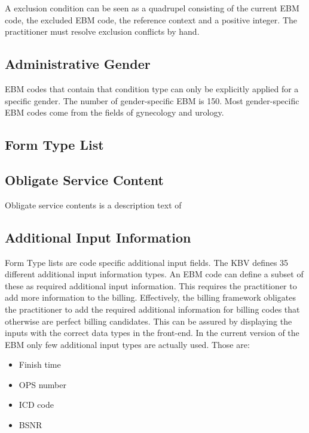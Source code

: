A exclusion condition can be seen as a quadrupel consisting of the current EBM code, the excluded EBM code, the reference context and a positive integer.
The practitioner must resolve exclusion conflicts by hand.

\subsection{Administrative Gender}\label{subsec:administrative-gender}
EBM codes that contain that condition type can only be explicitly applied for a specific gender.
The number of gender-specific EBM is 150.
Most gender-specific EBM codes come from the fields of gynecology and urology.

\subsection{Form Type List}\label{subsec:form-type-list}

\subsection{Obligate Service Content}\label{subsec:obligate-service-content}
Obligate service contents is a description text of \todo{}

\subsection{Additional Input Information}\label{subsec:additional-information}
Form Type lists are code specific additional input fields.
The KBV defines 35 different additional input information types.
An EBM code can define a subset of these as required additional input information.
This requires the practitioner to add more information to the billing.
Effectively, the billing framework obligates the practitioner to add the required additional information for billing codes that otherwise are perfect billing candidates.
This can be assured by displaying the inputs with the correct data types in the front-end.
In the current version of the EBM only few additional input types are actually used.
Those are:
\begin{itemize}
    \item Finish time
    \item OPS number
    \item ICD code
    \item BSNR
\end{itemize}